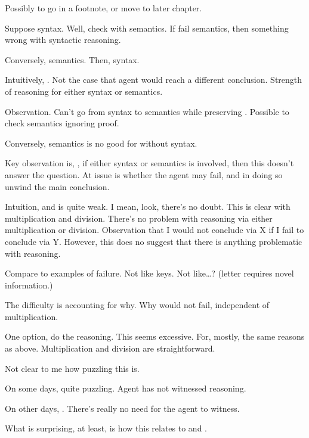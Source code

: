 \begin{note}
  {
    \color{red}
    Possibly to go in a footnote, or move to later chapter.
  }

  Suppose syntax.
  Well, check with semantics.
  If fail semantics, then something wrong with syntactic reasoning.

  Conversely, semantics.
  Then, syntax.

  Intuitively, \zS{}.
  Not the case that agent would reach a different conclusion.
  Strength of reasoning for either syntax or semantics.

  Observation.
  Can't go from syntax to semantics while preserving \zS{}.
  Possible to check semantics ignoring proof.

  Conversely, semantics is no good for \zS{} without syntax.

  Key observation is, \zS{}, if either syntax or semantics is involved, then this doesn't answer the question.
  At issue is whether the agent may fail, and in doing so unwind the main conclusion.
\end{note}

\begin{note}[Give up on \zS{}]
  Intuition, and \zS{} is quite weak.
  I mean, look, there's no doubt.
  This is clear with multiplication and division.
  There's no problem with reasoning via either multiplication or division.
  Observation that I would not conclude via X if I fail to conclude via Y.
  However, this does no suggest that there is anything problematic with reasoning.

  Compare to examples of failure.
  Not like keys.
  Not like\dots? (letter requires novel information.)

  The difficulty is accounting for why.
  Why would not fail, independent of multiplication.
\end{note}

\begin{note}
  One option, do the reasoning.
  This seems excessive.
  For, mostly, the same reasons as above.
  Multiplication and division are straightforward.
\end{note}

\begin{note}
  Not clear to me how puzzling this is.

  On some days, quite puzzling.
  Agent has not witnessed reasoning.

  On other days, .
  There's really no need for the agent to witness.

  What is surprising, at least, is how this relates to \qWhy{} and \qHow{}.
\end{note}

